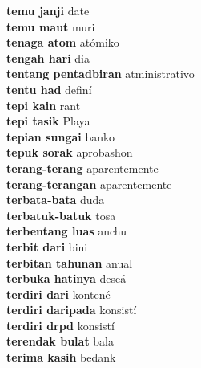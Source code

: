 \textbf{ temu janji  } date \\
\textbf{ temu maut  } muri \\
\textbf{ tenaga atom  } atómiko \\
\textbf{ tengah hari  } dia \\
\textbf{ tentang pentadbiran  } atministrativo \\
\textbf{ tentu had  } definí \\
\textbf{ tepi kain  } rant \\
\textbf{ tepi tasik  } Playa \\
\textbf{ tepian sungai  } banko \\
\textbf{ tepuk sorak  } aprobashon \\
\textbf{ terang-terang  } aparentemente \\
\textbf{ terang-terangan  } aparentemente \\
\textbf{ terbata-bata  } duda \\
\textbf{ terbatuk-batuk  } tosa \\
\textbf{ terbentang luas  } anchu \\
\textbf{ terbit dari  } bini \\
\textbf{ terbitan tahunan  } anual \\
\textbf{ terbuka hatinya  } deseá \\
\textbf{ terdiri dari  } kontené \\
\textbf{ terdiri daripada  } konsistí \\
\textbf{ terdiri drpd  } konsistí \\
\textbf{ terendak bulat  } bala \\
\textbf{ terima kasih  } bedank \\
